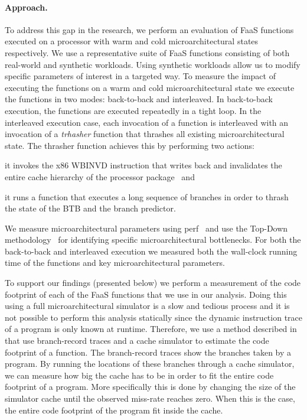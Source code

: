 \documentclass[../main.tex]{subfiles}
\begin{document}
\begin{refsection}
\paragraph{Approach.}
To address this gap in the research, we perform an evaluation of FaaS
functions executed on a processor with warm and cold
microarchitectural states respectively. We use a representative suite
of FaaS functions consisting of both real-world and synthetic
workloads. Using synthetic workloads allow us to modify specific
parameters of interest in a targeted way. To measure the impact of
executing the functions on a warm and cold microarchitectural state we
execute the functions in two modes: back-to-back and interleaved. In
back-to-back execution, the functions are executed repeatedly in a
tight loop. In the interleaved execution case, each invocation of a
function is interleaved with an invocation of a \emph{trhasher}
function that thrashes all existing microarchitectural state. The
thrasher function achieves this by performing two
actions: \begin{inparaenum}[1)]
\item it invokes the x86 WBINVD
  instruction that writes back and invalidates the entire cache
  hierarchy of the processor package~\cite[Chapter 6]{intelmanual} and \item it runs a function that
  executes a long sequence of branches in order to thrash the state of
  the BTB and the branch predictor. \end{inparaenum} We measure
microarchitectural parameters using perf~\cite{perftool} and use the Top-Down
methodology~\cite{yasin14_top_down} for identifying specific
microarchitectural bottlenecks. For both the back-to-back and
interleaved execution we measured both the wall-clock running time of
the functions and key microarchitectural parameters.

To support our findings (presented below) we perform a measurement of
the code footprint of each of the FaaS functions that we use in our
analysis. Doing this using a full microarchitectural simulator is a
slow and tedious process and it is not possible to perform this
analysis statically since the dynamic instruction trace of a program
is only known at runtime.  Therefore, we use a method described
in~\cite{splash2} that use branch-record traces and a cache simulator
to estimate the code footprint of a function. The branch-record traces
show the branches taken by a program. By running the locations of
these branches through a cache simulator, we can measure how big the
cache has to be in order to fit the entire code footprint of a
program. More specifically this is done by changing the size of the
simulator cache until the observed miss-rate reaches zero. When this
is the case, the entire code footprint of the program fit inside the
cache.



\end{refsection}
\end{document}
